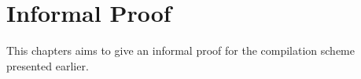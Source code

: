 \chapter{Informal Proof}
\label{chap:InformalProof}
This chapters aims to give an informal proof for the compilation scheme presented earlier.